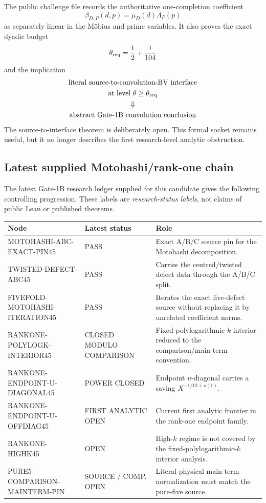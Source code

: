 \documentclass[11pt]{article}
\theoremstyle{definition}
\newcommand{\1}{\mathbf 1}
\newcommand{\status}[1]{\textsf{#1}}
\begin{document}
{{{The public challenge file records the authoritative one-completion coefficient
\[
\boxed{\beta_{D,P}(d,p)=\mu_D(d)\Lambda_P(p)}
\]
as separately linear in the M\"obius and prime variables.  It also proves the exact dyadic
budget
\[
\theta_{\rm req}=\frac12+\frac1{104}
\]
and the implication
\[
\begin{gathered}
\text{literal source-to-convolution-BV interface}\\
\text{at level }\theta\ge\theta_{\rm req}\\
\Downarrow\\
\text{abstract Gate-1B convolution conclusion}
\end{gathered}
\]
The source-to-interface theorem is deliberately open.  This formal socket remains useful,
but it no longer describes the first research-level analytic obstruction.

\subsection{Latest supplied Motohashi/rank-one chain}

The latest Gate-1B research ledger supplied for this candidate gives the following
controlling progression.  These labels are \emph{research-status labels}, not claims of
public Lean or published theorems.

\begin{center}
\renewcommand{\arraystretch}{1.17}
\begin{tabularx}{\textwidth}{>{\ttfamily\raggedright\arraybackslash}p{}
>{\raggedright\arraybackslash}p{}X}
\toprule
Node & Latest status & Role\\
\midrule
MOTOHASHI-ABC-EXACT-PIN45 & \status{PASS} &
Exact A/B/C source pin for the Motohashi decomposition.\\
TWISTED-DEFECT-ABC45 & \status{PASS} &
Carries the centred/twisted defect data through the A/B/C split.\\
FIVEFOLD-MOTOHASHI-ITERATION45 & \status{PASS} &
Iterates the exact five-defect source without replacing it by unrelated coefficient norms.\\
RANKONE-POLYLOGK-INTERIOR45 & \status{CLOSED MODULO COMPARISON} &
Fixed-polylogarithmic-$k$ interior reduced to the comparison/main-term convention.\\
RANKONE-ENDPOINT-U-DIAGONAL45 & \status{POWER CLOSED} &
Endpoint $u$-diagonal carries a saving $X^{-1/12+o(1)}$.\\
RANKONE-ENDPOINT-U-OFFDIAG45 & \status{FIRST ANALYTIC OPEN} &
Current first analytic frontier in the rank-one endpoint family.\\
RANKONE-HIGHK45 & \status{OPEN} &
High-$k$ regime is not covered by the fixed-polylogarithmic-$k$ interior analysis.\\
PURE5-COMPARISON-MAINTERM-PIN & \status{SOURCE / COMP. OPEN} &
Literal physical main-term normalization must match the pure-five source.\\
\bottomrule
\end{tabularx}
\end{center}

}}}
\end{document}

